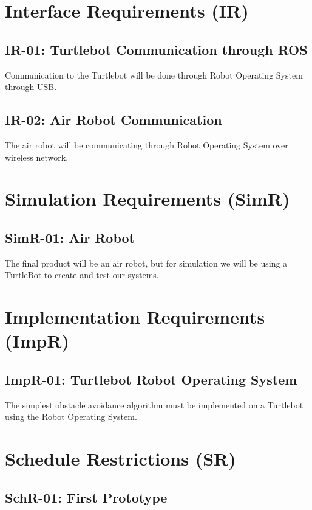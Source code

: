 \documentclass[]{report}
\begin{document}
\section{Interface Requirements (IR)}

\subsection{IR-01: Turtlebot Communication through ROS}
Communication to the Turtlebot will be done through Robot Operating System through USB.

\subsection{IR-02: Air Robot Communication}
The air robot will be communicating through Robot Operating System over wireless network.


\section{Simulation Requirements (SimR)}

\subsection{SimR-01: Air Robot}
The final product will be an air robot, but for simulation we will be using a TurtleBot to create and test our systems. 


\section{Implementation Requirements (ImpR)}

\subsection{ImpR-01: Turtlebot Robot Operating System}
The simplest obstacle avoidance algorithm must be implemented on a Turtlebot using the Robot Operating System.


\section{Schedule Restrictions (SR)}

\subsection{SchR-01: First Prototype}
\end{document}
